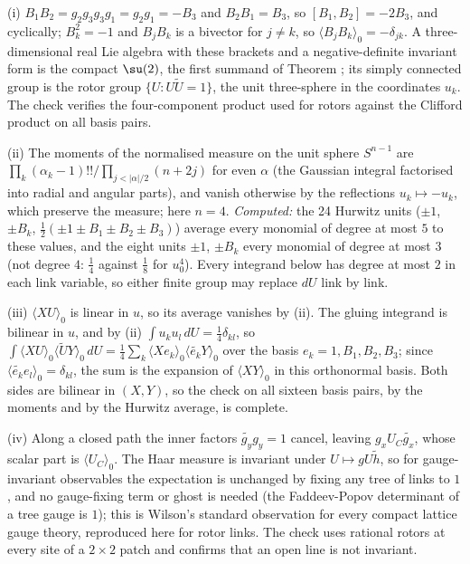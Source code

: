(i) $B_1B_2 = g_2g_3g_3g_1 = g_2g_1 = -B_3$ and $B_2B_1 = B_3$, so $[B_1, B_2] = -2B_3$, and cyclically; $B_k^2 = -1$ and $B_jB_k$ is a bivector for $j \ne k$, so $\langle B_jB_k\rangle_0 = -\delta_{jk}$. A three-dimensional real Lie algebra with these brackets and a negative-definite invariant form is the compact $\su(2)$, the first summand of Theorem ; its simply connected group is the rotor group $\{U : U\widetilde{U} = 1\}$, the unit three-sphere in the coordinates $u_k$. The check verifies the four-component product used for rotors against the Clifford product on all basis pairs.

(ii) The moments of the normalised measure on the unit sphere $S^{n-1}$ are $\prod_k(\alpha_k - 1)!!/\prod_{j < |\alpha|/2}(n + 2j)$ for even $\alpha$ (the Gaussian integral factorised into radial and angular parts), and vanish otherwise by the reflections $u_k \mapsto -u_k$, which preserve the measure; here $n = 4$. \emph{Computed:} the 24 Hurwitz units ($\pm1$, $\pm B_k$, $\tfrac12(\pm1 \pm B_1 \pm B_2 \pm B_3)$) average every monomial of degree at most $5$ to these values, and the eight units $\pm1$, $\pm B_k$ every monomial of degree at most $3$ (not degree $4$: $\tfrac14$ against $\tfrac18$ for $u_0^4$). Every integrand below has degree at most $2$ in each link variable, so either finite group may replace $dU$ link by link.

(iii) $\langle XU\rangle_0$ is linear in $u$, so its average vanishes by (ii). The gluing integrand is bilinear in $u$, and by (ii) $\int u_ku_l\,dU = \tfrac14\delta_{kl}$, so $\int\langle XU\rangle_0\langle\widetilde{U}Y\rangle_0\,dU = \tfrac14\sum_k\langle Xe_k\rangle_0\langle\widetilde{e_k}Y\rangle_0$ over the basis $e_k = 1, B_1, B_2, B_3$; since $\langle\widetilde{e_k}e_l\rangle_0 = \delta_{kl}$, the sum is the expansion of $\langle XY\rangle_0$ in this orthonormal basis. Both sides are bilinear in $(X, Y)$, so the check on all sixteen basis pairs, by the moments and by the Hurwitz average, is complete.

(iv) Along a closed path the inner factors $\widetilde{g_y}g_y = 1$ cancel, leaving $g_xU_C\widetilde{g_x}$, whose scalar part is $\langle U_C\rangle_0$. The Haar measure is invariant under $U \mapsto gU\widetilde{h}$, so for gauge-invariant observables the expectation is unchanged by fixing any tree of links to $1$, and no gauge-fixing term or ghost is needed (the Faddeev-Popov determinant of a tree gauge is $1$); this is Wilson's standard observation for every compact lattice gauge theory, reproduced here for rotor links. The check uses rational rotors at every site of a $2 \times 2$ patch and confirms that an open line is not invariant.

